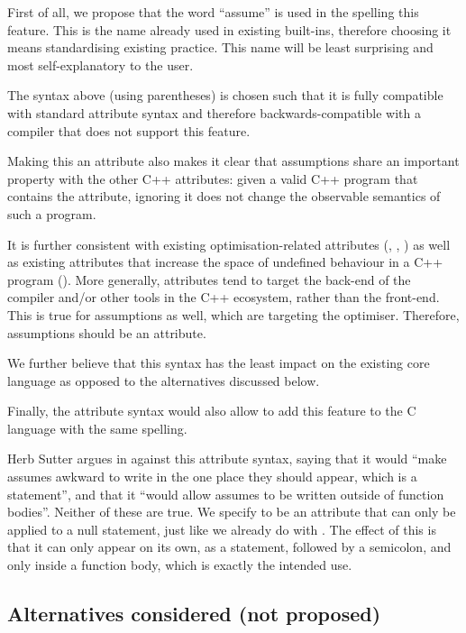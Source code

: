First of all, we propose that the word ``assume'' is used in the spelling this feature. This is the name already used in existing built-ins, therefore choosing it means standardising existing practice. This name will be least surprising and most self-explanatory to the user.

The syntax above (using parentheses) is chosen such that it is fully compatible with standard attribute syntax and therefore backwards-compatible with a compiler that does not support this feature. 

Making this an attribute also makes it clear that assumptions share an important property with the other C++ attributes: given a valid C++ program that contains the attribute, ignoring it does not change the observable semantics of such a program.

It is further consistent with existing optimisation-related attributes (\tcode{[[likely]]}, \tcode{[[unlikely]]}, ) as well as existing attributes that increase the space of undefined behaviour in a C++ program (\tcode{[[noreturn]]}). More generally, attributes tend to target the back-end of the compiler and/or other tools in the C++ ecosystem, rather than the front-end. This is true for assumptions as well, which are targeting the optimiser. Therefore, assumptions should be an attribute.

We further believe that this syntax has the least impact on the existing core language as opposed to the alternatives discussed below.

Finally, the attribute syntax would also allow to add this feature to the C language with the same spelling.

Herb Sutter argues in \cite{P2064R0} against this attribute syntax, saying that it would ``make assumes awkward to write in the one place they should appear, which is a statement'', and that it ``would allow assumes to be written outside of function bodies''. Neither of these are true. We specify  to be an attribute that can only be applied to a null statement, just like we already do with \tcode{[[fallthrough]]}. The effect of this is that it can only appear on its own, as a statement, followed by a semicolon, and only inside a function body, which is exactly the intended use.

\subsection{Alternatives considered (not proposed)}
\label{subsec:syntax_alternatives}

